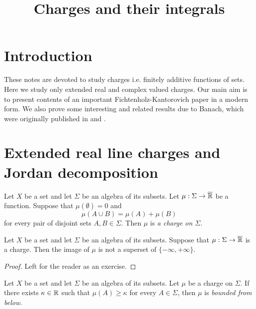



\title{Charges and their integrals}
\date{}
\maketitle

\section{Introduction}
\noindent
These notes are devoted to study charges i.e. finitely additive functions of sets. Here we study only extended real and complex valued charges. Our main aim is to present contents of an important Fichtenholz-Kantorovich paper \cite{fichtenholz1934operations} in a modern form. We also prove some interesting and related results due to Banach, which were originally published in \cite{banach1923problemelameasure} and \cite{banach1979theorieoperationslineaires}.

\section{Extended real line charges and Jordan decomposition}

\begin{definition}
    Let $X$ be a set and let $\Sigma$ be an algebra of its subsets. Let $\mu:\Sigma \rightarrow \overline{{\mathbb R}}$ be a function. Suppose that $\mu(\emptyset) = 0$ and
    $$\mu(A \cup B) = \mu(A) + \mu(B)$$
    for every pair of disjoint sets $A,B \in \Sigma$. Then $\mu$ is \textit{a charge on $\Sigma$}.
\end{definition}

\begin{fact}\label{fact:one_side_infinity_only_for_finitely_additive}
    Let $X$ be a set and let $\Sigma$ be an algebra of its subsets. Suppose that $\mu:\Sigma \rightarrow \overline{{\mathbb R}}$ is a charge. Then the image of $\mu$ is not a superset of $\{-\infty,+\infty\}$.
\end{fact}
\begin{proof}
    Left for the reader as an exercise.
\end{proof}

\begin{definition}
    Let $X$ be a set and let $\Sigma$ be an algebra of its subsets. Let $\mu$ be a charge on $\Sigma$. If there exists $\kappa \in {\mathbb R}$ such that $\mu(A) \geq
        \kappa$ for every $A \in \Sigma$, then $\mu$ is \textit{bounded from below}.
\end{definition}

